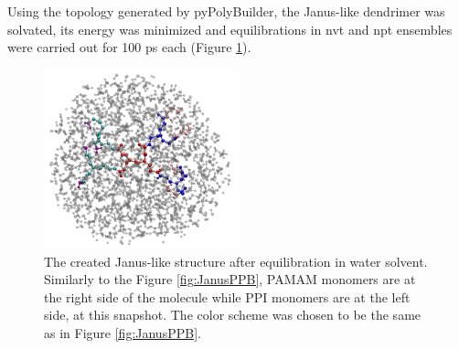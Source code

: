 Using the topology generated by pyPolyBuilder, the Janus-like dendrimer was solvated, its energy was minimized and equilibrations in nvt and npt ensembles were carried out for 100 ps each (Figure \ref{fig:JanusSOL}).

\begin{figure}
    \centering
    \includegraphics[width=0.5\textwidth]{PAMAM_PPI-Janus/PAMAM_PPISOL.pdf}
    \caption{The created Janus-like structure after equilibration in water solvent.
    Similarly to the Figure \ref{fig:JanusPPB}, PAMAM monomers are at the right side of the molecule while PPI monomers are at the left side, at this snapshot.
    The color scheme was chosen to be the same as in Figure \ref{fig:JanusPPB}.}
    \label{fig:JanusSOL}
\end{figure}
